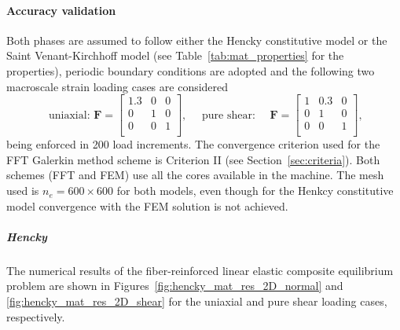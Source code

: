 \FloatBarrier

\paragraph{Accuracy validation}

Both phases are assumed to follow either the Hencky constitutive model or the Saint Venant-Kirchhoff model (see Table~\ref{tab:mat_properties} for the properties), periodic boundary conditions are adopted and the following two macroscale strain loading cases are considered
\begin{equation}
\text { uniaxial: } \bm{F}=\left[\begin{array}{ccc}
1.3 & 0 & 0 \\
0 & 1 & 0  \\
0 & 0 & 1  \\
\end{array}\right], \quad \text { pure shear: } \quad \bm F=\left[\begin{array}{ccc}
1 & 0.3 & 0 \\
0 & 1 & 0  \\
0 & 0 & 1  \\
\end{array}\right],
\end{equation}
being enforced in 200 load increments.
The convergence criterion used for the FFT Galerkin method scheme is Criterion II (see Section~\ref{sec:criteria}).
Both schemes (FFT and FEM) use all the cores available in the machine.
The mesh used is \(n_e=600\times 600\) for both models, even though for the Henkcy constitutive model convergence with the FEM solution is not achieved.

\subparagraph{Hencky}
\label{sec:hencky_accuracy_validation}

The numerical results of the fiber-reinforced linear elastic composite equilibrium problem are shown in Figures~\ref{fig:hencky_mat_res_2D_normal} and \ref{fig:hencky_mat_res_2D_shear} for the uniaxial and pure shear loading cases, respectively.

